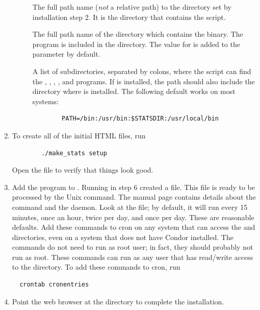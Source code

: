 \begin{enumerate}
\begin{description}
	\item[] The full path name
	(\emph{not} a relative path) to the  directory set
	by installation step 2.  
	It is the directory that contains the  script.

	\item[]  The full path name of the
	directory which contains the  binary.
	The  program is included in the 
	directory. 
	The value for  is added to the 
	parameter by default.  

	\item[] A list of subdirectories,
	separated by colons, where the  script can find
	the , , , , and 
	programs.  
	If  is installed, the path should also
	include the directory where  is installed.
	The following default works on most systems:
        \begin{verbatim} 
        PATH=/bin:/usr/bin:$STATSDIR:/usr/local/bin
        \end{verbatim}

        \end{description}

\item To create all of the initial HTML files, run
\begin{verbatim}
        ./make_stats setup  
\end{verbatim}
Open the file  to verify that things look good.


\item Add the  program to .  
Running  in step 6 created a  file.
This  file is ready to be processed by the Unix
 command.
The  manual page contains details about
the  command and the  daemon.
Look at the
 file; by default, it will run 
  every 15 minutes, 
  once an hour, 
  twice per day, and 
  once per day.
These are reasonable defaults.  
Add these commands to cron on any
system that can access the  and
 directories,
even on a system that does not have Condor installed.
The commands do not need to run as root user;
in fact, they should probably not run as root.  These commands can run
as any user that has read/write access to the  directory.
To add these
commands to cron, run
\begin{verbatim} 
  crontab cronentries
\end{verbatim}

\item Point the web browser at the  directory
to complete the installation.

\end{enumerate}

